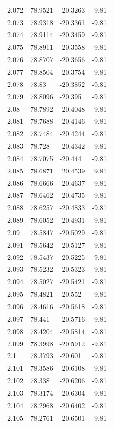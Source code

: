 \begin{tabular}{llll}
2.072 & 78.9521 & -20.3263 & -9.81 \\
2.073 & 78.9318 & -20.3361 & -9.81 \\
2.074 & 78.9114 & -20.3459 & -9.81 \\
2.075 & 78.8911 & -20.3558 & -9.81 \\
2.076 & 78.8707 & -20.3656 & -9.81 \\
2.077 & 78.8504 & -20.3754 & -9.81 \\
2.078 & 78.83 & -20.3852 & -9.81 \\
2.079 & 78.8096 & -20.395 & -9.81 \\
2.08 & 78.7892 & -20.4048 & -9.81 \\
2.081 & 78.7688 & -20.4146 & -9.81 \\
2.082 & 78.7484 & -20.4244 & -9.81 \\
2.083 & 78.728 & -20.4342 & -9.81 \\
2.084 & 78.7075 & -20.444 & -9.81 \\
2.085 & 78.6871 & -20.4539 & -9.81 \\
2.086 & 78.6666 & -20.4637 & -9.81 \\
2.087 & 78.6462 & -20.4735 & -9.81 \\
2.088 & 78.6257 & -20.4833 & -9.81 \\
2.089 & 78.6052 & -20.4931 & -9.81 \\
2.09 & 78.5847 & -20.5029 & -9.81 \\
2.091 & 78.5642 & -20.5127 & -9.81 \\
2.092 & 78.5437 & -20.5225 & -9.81 \\
2.093 & 78.5232 & -20.5323 & -9.81 \\
2.094 & 78.5027 & -20.5421 & -9.81 \\
2.095 & 78.4821 & -20.552 & -9.81 \\
2.096 & 78.4616 & -20.5618 & -9.81 \\
2.097 & 78.441 & -20.5716 & -9.81 \\
2.098 & 78.4204 & -20.5814 & -9.81 \\
2.099 & 78.3998 & -20.5912 & -9.81 \\
2.1 & 78.3793 & -20.601 & -9.81 \\
2.101 & 78.3586 & -20.6108 & -9.81 \\
2.102 & 78.338 & -20.6206 & -9.81 \\
2.103 & 78.3174 & -20.6304 & -9.81 \\
2.104 & 78.2968 & -20.6402 & -9.81 \\
2.105 & 78.2761 & -20.6501 & -9.81 \\

\end{tabular}
